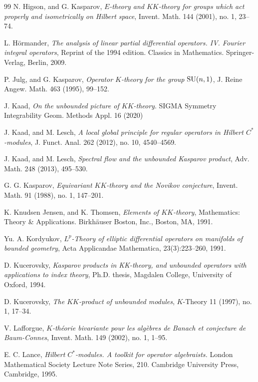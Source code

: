 \documentclass[a4paper,reqno]{amsart}
\numberwithin{equation}{section}
\theoremstyle{definition}
\theoremstyle{remark}
\begin{document}
\begin{thebibliography}{99}
 N. Higson, and G. Kasparov, \emph{$E$-theory and $KK$-theory for groups which act properly and isometrically on Hilbert space}, Invent. Math. 144 (2001), no. 1, 23--74.


 L. Hörmander, \emph{The analysis of linear partial differential operators. IV. Fourier integral operators}, Reprint of the 1994 edition. Classics in Mathematics. Springer-Verlag, Berlin, 2009. 


 P. Julg, and G. Kasparov, \emph{Operator $K$-theory for the group ${\rm SU}(n,1)$}, J. Reine Angew. Math. 463 (1995), 99--152. 


 J. Kaad, \emph{On the unbounded picture of $KK$-theory}. SIGMA Symmetry Integrability Geom. Methods Appl. 16 (2020)


 J. Kaad, and M. Lesch, \emph{A local global principle for regular operators in Hilbert $C^*$-modules}, J. Funct. Anal. 262 (2012), no. 10, 4540--4569. 


 J. Kaad, and M. Lesch, \emph{Spectral flow and the unbounded Kasparov product}, Adv. Math. 248 (2013), 495--530.






 G. G. Kasparov, \emph{Equivariant $KK$-theory and the Novikov conjecture}, Invent. Math. 91 (1988), no. 1, 147--201.

 K. Knudsen Jensen, and K. Thomsen, \emph{Elements of $KK$-theory}, Mathematics: Theory \& Applications. Birkhäuser Boston, Inc., Boston, MA, 1991. 

 Yu. A. Kordyukov, \emph{$L^p$-Theory of elliptic differential operators on manifolds of bounded geometry}, Acta Applicandae Mathematica, 23(3):223--260, 1991.


 D. Kucerovsky, \emph{Kasparov products in KK-theory, and unbounded operators with applications to index theory}, Ph.D. thesis, Magdalen College, University of Oxford, 1994.


 D. Kucerovsky, \emph{The $KK$-product of unbounded modules}, $K$-Theory 11 (1997), no. 1, 17--34.


 V. Lafforgue, \emph{$K$-théorie bivariante pour les algèbres de Banach et conjecture de Baum-Connes}, Invent. Math. 149 (2002), no. 1, 1--95.


 E. C. Lance, \emph{Hilbert $C^*$-modules. A toolkit for operator algebraists.} London Mathematical Society Lecture Note Series, 210. Cambridge University Press, Cambridge, 1995. 



\end{thebibliography}
\end{document}
